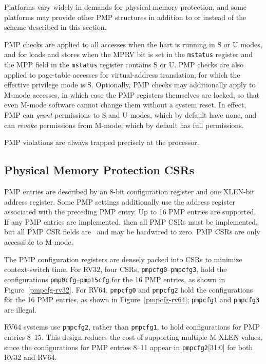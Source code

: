 \begin{commentary}
Platforms vary widely in demands for physical memory protection, and
some platforms may provide other PMP structures in addition to or
instead of the scheme described in this section.
\end{commentary}

PMP checks are applied to all accesses when the hart is running in
S or U modes, and for loads and stores when the MPRV bit is set in
the {\tt mstatus} register and the MPP field in the {\tt mstatus}
register contains S or U.  PMP checks are also applied to page-table
accesses for virtual-address translation, for which the effective
privilege mode is S.  Optionally, PMP checks may additionally apply
to M-mode accesses, in which case the PMP registers themselves are
locked, so that even M-mode software cannot change them without
a system reset.  In effect, PMP can {\em grant} permissions to S and U
modes, which by default have none, and can {\em revoke} permissions
from M-mode, which by default has full permissions.

PMP violations are always trapped precisely at the processor.

\subsection{Physical Memory Protection CSRs}

PMP entries are described by an 8-bit configuration register and one XLEN-bit
address register.  Some PMP settings additionally use the address register
associated with the preceding PMP entry.  Up to 16 PMP entries are supported.
If any PMP entries are implemented, then all PMP CSRs must be implemented,
but all PMP CSR fields are \warl\ and may be hardwired to zero.  PMP CSRs
are only accessible to M-mode.

The PMP configuration registers are densely packed into CSRs to minimize
context-switch time.  For RV32, four CSRs, {\tt pmpcfg0}--{\tt pmpcfg3}, hold
the configurations {\tt pmp0cfg}--{\tt pmp15cfg} for the 16 PMP entries, as
shown in Figure~\ref{pmpcfg-rv32}.  For RV64, {\tt pmpcfg0} and {\tt pmpcfg2}
hold the configurations for the 16 PMP entries, as shown in
Figure~\ref{pmpcfg-rv64}; {\tt pmpcfg1} and {\tt pmpcfg3} are illegal.

\begin{commentary}
RV64 systems use {\tt pmpcfg2}, rather than {\tt pmpcfg1}, to hold
configurations for PMP entries 8--15.  This design reduces the cost of
supporting multiple M-XLEN values, since the configurations for PMP
entries 8--11 appear in {\tt pmpcfg2}[31:0] for both RV32 and RV64.
\end{commentary}

